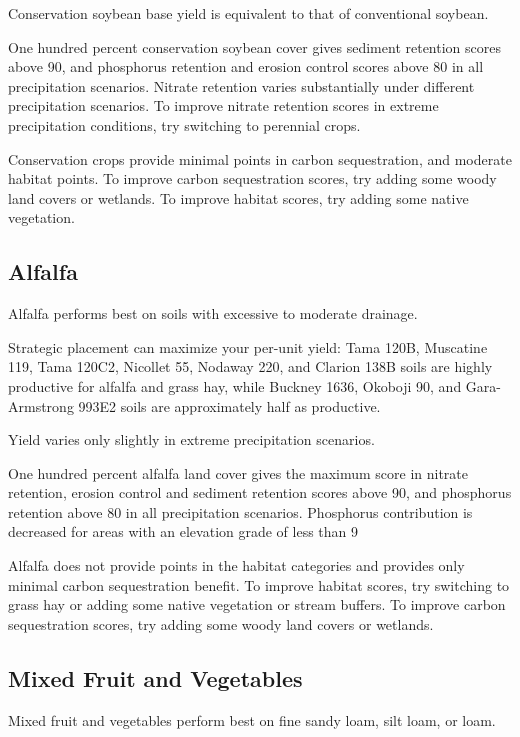 \documentclass[11pt]{article}
\begin{document}
Conservation soybean base yield is equivalent to that of conventional soybean.

One hundred percent conservation soybean cover gives sediment retention scores above 90, and phosphorus retention and erosion control scores above 80 in all precipitation scenarios. Nitrate retention varies substantially under different precipitation scenarios. To improve nitrate retention scores in extreme precipitation conditions, try switching to perennial crops.

Conservation crops provide minimal points in carbon sequestration, and moderate habitat points. To improve carbon sequestration scores, try adding some woody land covers or wetlands. To improve habitat scores, try adding some native vegetation.

\subsection{Alfalfa}

Alfalfa performs best on soils with excessive to moderate drainage.

Strategic placement can maximize your per-unit yield: Tama 120B, Muscatine 119, Tama 120C2, Nicollet 55, Nodaway 220, and Clarion 138B soils are highly productive for alfalfa and grass hay, while Buckney 1636, Okoboji 90, and Gara-Armstrong 993E2 soils are approximately half as productive.

Yield varies only slightly in extreme precipitation scenarios. 

One hundred percent alfalfa land cover gives the maximum score in nitrate retention, erosion control and sediment retention scores above 90, and phosphorus retention above 80 in all precipitation scenarios. Phosphorus contribution is decreased for areas with an elevation grade of less than 9%

Alfalfa does not provide points in the habitat categories and provides only minimal carbon sequestration benefit. To improve habitat scores, try switching to grass hay or adding some native vegetation or stream buffers. To improve carbon sequestration scores, try adding some woody land covers or wetlands.

\subsection{Mixed Fruit and Vegetables}

Mixed fruit and vegetables perform best on fine sandy loam, silt loam, or loam. 
\end{document}
